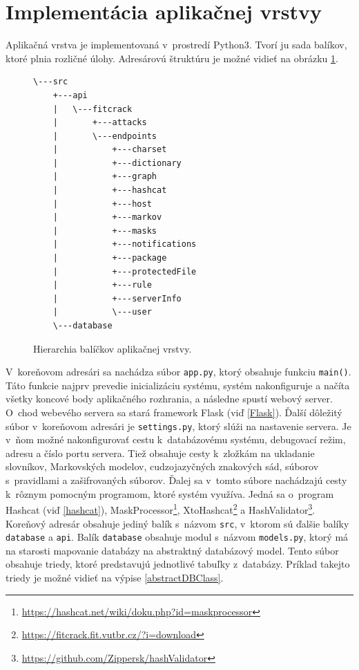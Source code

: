 \documentclass[slovak]{fitthesis}
\begin{document}
\section{Implementácia aplikačnej vrstvy}
Aplikačná vrstva je implementovaná v~prostredí Python3. Tvorí ju sada balíkov, ktoré plnia rozličné úlohy. Adresárovú štruktúru je možné vidieť na obrázku \ref{fig:serverStructure}.
\begin{figure}[H]
\begin{center}
\begin{varwidth}{\linewidth}
\begin{verbatim}
\---src
    +---api
    |   \---fitcrack
    |       +---attacks
    |       \---endpoints
    |           +---charset
    |           +---dictionary
    |           +---graph
    |           +---hashcat
    |           +---host
    |           +---markov
    |           +---masks
    |           +---notifications
    |           +---package
    |           +---protectedFile
    |           +---rule
    |           +---serverInfo
    |           \---user
    \---database
\end{verbatim}
\end{varwidth}
\end{center}
\caption{Hierarchia balíčkov aplikačnej vrstvy.}
\label{fig:serverStructure}
\end{figure}
V~koreňovom adresári sa nachádza súbor \texttt{app.py}, ktorý obsahuje funkciu \texttt{main()}. Táto funkcie najprv prevedie inicializáciu systému, systém nakonfiguruje a načíta všetky koncové body aplikačného rozhrania, a následne spustí webový server. O~chod webevého servera sa stará framework Flask (viď \ref{Flask}). Ďalší dôležitý súbor v~koreňovom adresári je \texttt{settings.py}, ktorý slúži na nastavenie servera. Je v~ňom možné nakonfigurovať cestu k~databázovému systému, debugovací režim, adresu a číslo portu servera. Tiež obsahuje cesty k~zložkám na ukladanie slovníkov, Markovských modelov, cudzojazyčných znakových sád, súborov s~pravidlami a zašifrovaných súborov. Ďalej sa v~tomto súbore nachádzajú cesty k~rôznym pomocným programom, ktoré systém využíva. Jedná sa o~program Hashcat (viď \ref{hashcat}), MaskProcessor\footnote{\url{https://hashcat.net/wiki/doku.php?id=maskprocessor}}, XtoHashcat\footnote{\url{https://fitcrack.fit.vutbr.cz/?i=download}} a HashValidator\footnote{\url{https://github.com/Zippersk/hashValidator}}. Koreňový adresár obsahuje jediný balík s~názvom \texttt{src}, v~ktorom sú ďalšie balíky \texttt{database} a \texttt{api}. Balík \texttt{database} obsahuje modul s~názvom \texttt{models.py}, ktorý má na starosti mapovanie databázy na abstraktný databázový model. Tento súbor obsahuje triedy, ktoré predstavujú jednotlivé tabuľky z~databázy. Príklad takejto triedy je možné vidieť na výpise \ref{abstractDBClass}. 
\end{document}
